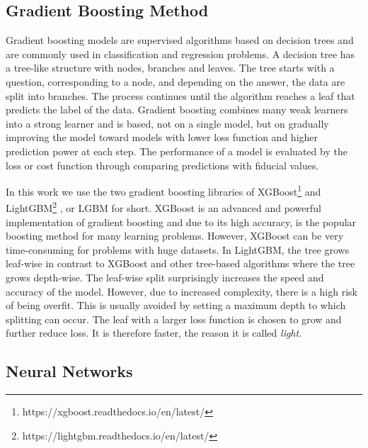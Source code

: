 \documentclass[fleqn,usenatbib]{mnras}
\begin{document}
\subsection{Gradient Boosting Method}
Gradient boosting models are supervised algorithms based on decision trees and are commonly used in classification and regression problems. 
A decision tree has a tree-like structure with nodes, branches and leaves.
The tree starts with a question, corresponding to a node, and depending on the answer, the data are split into branches. The process continues until the algorithm reaches a leaf that predicts the label of the data.
Gradient boosting combines many weak learners into a strong learner and is based, not on a single model, but on gradually improving the model toward models with lower loss function and higher prediction power at each step.
The performance of a model is evaluated by the loss or cost function through  
comparing predictions with fiducial values. 

In this work we use the two gradient boosting libraries of XGBoost\footnote{https://xgboost.readthedocs.io/en/latest/} \citep{che16} and LightGBM\footnote{https://lightgbm.readthedocs.io/en/latest/} \citep{lig17}, or LGBM for short. 
XGBoost is an advanced and powerful implementation of gradient boosting and due to its high accuracy, is the popular boosting method for many learning problems.  
%
However,  XGBoost can be very time-consuming  for  problems with huge datasets. 
In LightGBM, the tree grows leaf-wise in contrast to XGBoost and other tree-based algorithms where  the tree grows depth-wise. The leaf-wise split surprisingly increases the speed and accuracy of the model.
However, due to increased complexity, there is a high risk of being overfit. This is usually avoided by setting a maximum depth to which splitting can occur. 
%
The leaf with a larger loss function is chosen to grow and  further reduce  loss. 
It is therefore faster, the reason it is called {\it light}.
\subsection{Neural Networks}
\end{document}
